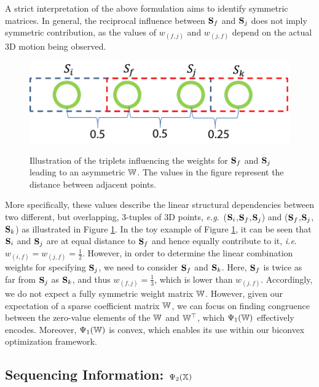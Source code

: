 A strict interpretation of the above formulation aims to identify symmetric matrices.
In general, the reciprocal influence between $\mathbf S_{f}$ and $\mathbf S_{j}$ does not imply symmetric contribution,
as the values of $w_{(f,j)}$ and  $w_{(j,f)}$ depend on the actual 3D motion being observed.
\begin{figure}
  \centering
  \includegraphics[width=0.75\columnwidth]{chapter5/resource/TripletFig.pdf}\\
  \caption[Illustration of the relationship between shape weights.]{Illustration of the triplets influencing the weights for $\mathbf S_f$ and $\mathbf S_j$ leading to an asymmetric $\mathbb W$. The values in the figure represent the distance between adjacent points.}
  \label{fig:Triplet}
\end{figure}
More specifically, these values describe the linear structural  dependencies between two different, but overlapping, 3-tuples of 3D points, \emph{e.g}.~($\mathbf S_{i}$,$\mathbf S_{f}$,$\mathbf S_{j}$) and ($\mathbf S_{f}$,$\mathbf S_{j}$,$\mathbf S_{k}$) as illustrated in Figure \ref{fig:Triplet}. In the toy example of Figure \ref{fig:Triplet}, it can be seen that $\mathbf S_{i}$ and $\mathbf S_{j}$ are at equal distance to $\mathbf S_{f}$ and hence equally contribute to it, \emph{i.e}.~$w_{(i,f)} = w_{(j,f)}=\frac{1}{2}$. However, in order to determine the linear combination weights for specifying $\mathbf S_j$, we need to consider $\mathbf S_f$ and $\mathbf S_k$. Here, $\mathbf S_f$ is twice as far from $\mathbf S_j$ as $\mathbf S_k$, and thus $w_{(f,j)}=\frac{1}{3}$, which is lower than $w_{(j,f)}$.
Accordingly, we do not expect a fully symmetric weight matrix   $\mathbb W$. However,  given our expectation of a sparse coefficient matrix $\mathbb W$, we can focus on finding congruence between the zero-value elements of the $\mathbb W$ and $\mathbb W^\top$, which $\Psi_1(\mathbb W)$ effectively encodes.
Moreover, $\Psi_1(\mathbb W)$  is convex, which enables its use within our biconvex optimization framework.

\subsection{Sequencing Information: \texorpdfstring{$\Psi_2(\mathbb X)$}{psiallX} }

